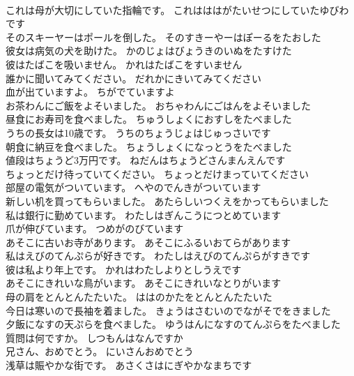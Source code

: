 \documentclass[8pt]{extreport}
\begin{document}
\begin{CJK}{UTF8}{min}
\\	これは母が大切にしていた指輪です。	これはははがたいせつにしていたゆびわです 
\\	そのスキーヤーはポールを倒した。	そのすきーやーはぽーるをたおした 
\\	彼女は病気の犬を助けた。	かのじょはびょうきのいぬをたすけた 
\\	彼はたばこを吸いません。	かれはたばこをすいません 
\\	誰かに聞いてみてください。	だれかにきいてみてください 
\\	血が出ていますよ。	ちがでていますよ 
\\	お茶わんにご飯をよそいました。	おちゃわんにごはんをよそいました 
\\	昼食にお寿司を食べました。	ちゅうしょくにおすしをたべました 
\\	うちの長女は10歳です。	うちのちょうじょはじゅっさいです 
\\	朝食に納豆を食べました。	ちょうしょくになっとうをたべました 
\\	値段はちょうど3万円です。	ねだんはちょうどさんまんえんです 
\\	ちょっとだけ待っていてください。	ちょっとだけまっていてください 
\\	部屋の電気がついています。	へやのでんきがついています 
\\	新しい机を買ってもらいました。	あたらしいつくえをかってもらいました 
\\	私は銀行に勤めています。	わたしはぎんこうにつとめています 
\\	爪が伸びています。	つめがのびています 
\\	あそこに古いお寺があります。	あそこにふるいおてらがあります 
\\	私はえびのてんぷらが好きです。	わたしはえびのてんぷらがすきです 
\\	彼は私より年上です。	かれはわたしよりとしうえです 
\\	あそこにきれいな鳥がいます。	あそこにきれいなとりがいます 
\\	母の肩をとんとんたたいた。	ははのかたをとんとんたたいた 
\\	今日は寒いので長袖を着ました。	きょうはさむいのでながそでをきました 
\\	夕飯になすの天ぷらを食べました。	ゆうはんになすのてんぷらをたべました 
\\	質問は何ですか。	しつもんはなんですか 
\\	兄さん、おめでとう。	にいさんおめでとう 
\\	浅草は賑やかな街です。	あさくさはにぎやかなまちです 

\end{CJK}
\end{document}
